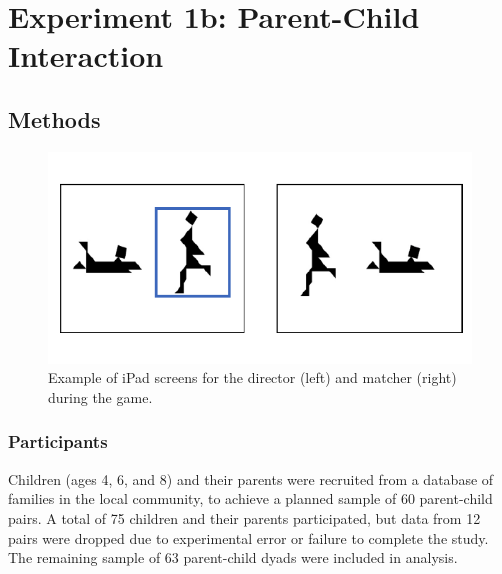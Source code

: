 \documentclass[10pt, letterpaper]{article}
\newenvironment{CodeChunk}{}{}
\begin{document}
\hypertarget{experiment-1b-parent-child-interaction}{%
\section{Experiment 1b: Parent-Child
Interaction}\label{experiment-1b-parent-child-interaction}}

\hypertarget{methods-1}{%
\subsection{Methods}\label{methods-1}}

\begin{CodeChunk}
\begin{figure}[h]

{\centering \includegraphics{figs/2-col-image-1} 

}

\caption[Example of iPad screens for the director (left) and matcher (right) during the game]{Example of iPad screens for the director (left) and matcher (right) during the game.}\label{fig:2-col-image}
\end{figure}
\end{CodeChunk}

\hypertarget{participants-1}{%
\subsubsection{Participants}\label{participants-1}}

Children (ages 4, 6, and 8) and their parents were recruited from a
database of families in the local community, to achieve a planned sample
of 60 parent-child pairs. A total of 75 children and their parents
participated, but data from 12 pairs were dropped due to experimental
error or failure to complete the study. The remaining sample of 63
parent-child dyads were included in analysis.
\end{document}
